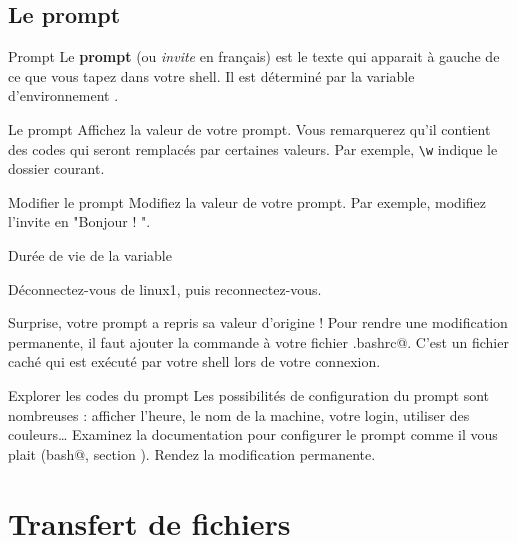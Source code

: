 \documentclass[a4paper,11pt]{style-esi/td}
\begin{document}
	\subsection{Le prompt}

		\begin{theorie}{Prompt}
			Le \textbf{prompt} (ou \textit{invite} en français) 
			est le texte qui apparait à gauche
			de ce que vous tapez dans votre shell. 
			Il est déterminé par la variable d'environnement .
		\end{theorie}
			
		\begin{Experience}{Le prompt} 
			Affichez la valeur de votre prompt. 
			Vous remarquerez qu'il contient des codes qui seront 
			remplacés par certaines valeurs. 
			Par exemple, \verb_\w_ indique le dossier courant.
		\end{Experience}
			
		\begin{Exercice}{Modifier le prompt} 
			Modifiez la valeur de votre prompt.
			Par exemple, modifiez l'invite en "Bonjour ! ".
		\end{Exercice}	

		\begin{Tutoriel}{Durée de vie de la variable} 
			\vspace{-1em}
			\begin{steps}
			\item Déconnectez-vous de linux1, puis reconnectez-vous.	
			\end{steps}
			Surprise, votre prompt a repris sa valeur d'origine ! 
			Pour rendre une modification permanente, 
			il faut ajouter la commande à votre fichier \verb@.bashrc@.
			C'est un fichier caché qui est exécuté 
			par votre shell lors de votre connexion.
		\end{Tutoriel}
			
		\begin{Exercice}{Explorer les codes du prompt}
			Les possibilités de configuration du prompt sont nombreuses : 
			afficher l'heure, le nom de la machine, votre login,
			utiliser des couleurs\dots{}
			Examinez la documentation pour configurer le prompt comme il 
			vous plait (\verb@man bash@, section \verb@PROMPTING@).
			Rendez la modification permanente.
		\end{Exercice}	

\section{Transfert de fichiers}  
\end{document}
